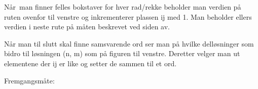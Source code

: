 \documentclass[12pt]{report}
\begin{document}

Når\ man finner felles bokstaver for hver rad/rekke beholder man verdien på ruten ovenfor til venstre og inkrementerer plassen ij  med 1. Man beholder ellers verdien i neste rute på måten beskrevet ved siden av. \par

Når man til slutt skal finne samsvarende ord ser man på hvilke delløsninger som bidro til løsningen (n, m) som på figuren til venstre. Deretter velger man ut elementene der ij er like og setter de sammen til et ord.\par


\vspace{\baselineskip}

\vspace{\baselineskip}

\vspace{\baselineskip}
Fremgangsmåte:\par
\end{document}
